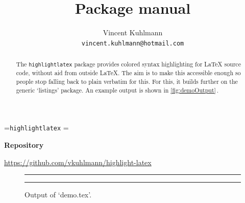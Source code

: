 \documentclass{ltxdoc}
\let\hll\lstinline
\begin{document}
\newbox\cmdintitle
\setbox\cmdintitle=\hbox{\hll|highlightlatex|}
\setbox\cmdintitle=\hbox{}

\title{Package \usebox\cmdintitle{} manual}
\author{
	Vincent Kuhlmann\\
	\texttt{vincent.kuhlmann@hotmail.com}
}


\maketitle
\begin{abstract}
	The \hll|highlightlatex| package provides colored syntax highlighting for \LaTeX{} source code, without aid from
	outside \LaTeX. The aim is to make this accessible enough so people stop falling back to plain verbatim for this.
	For this, it builds further on the generic `listings' package. An example output is	shown in \autoref{fig:demoOutput}\,.
\end{abstract}

\bigskip

\begin{center}
	{\small\textbf{Repository}}

	\url{https://github.com/vkuhlmann/highlight-latex}
\end{center}

\vspace{5\baselineskip}

\begin{figure}[htbp]
	\centering
	\rule{2cm}{1pt}

	\bigskip
	\caption{Output of `demo.tex'.}\label{fig:demoOutput}
	\bigskip
	\rule{2cm}{1pt}
\end{figure}
\end{document}
